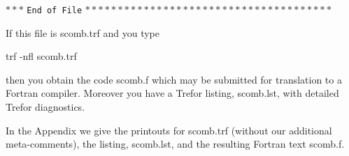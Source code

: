 
$***$ {\tt End of File} $**************************************$

\baselineskip=18pt

\quad   If this file is scomb.trf and you type

\quad   trf -nfl scomb.trf

then you obtain the code scomb.f which may be submitted for translation
to a Fortran compiler. Moreover you have a Trefor listing, scomb.lst,
with detailed Trefor diagnostics.

In the Appendix we give the printouts for scomb.trf (without our
additional meta-comments), the listing, scomb.lst, and the resulting Fortran
text scomb.f.
